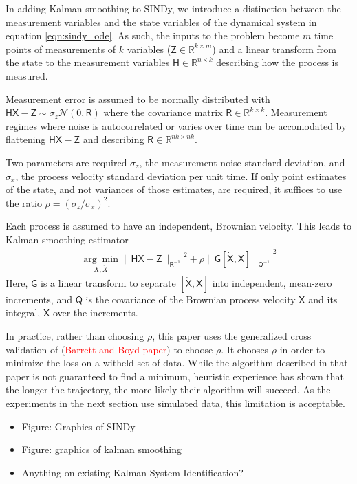 \documentclass{article}
\newcommand{\red}[1]{\textcolor{red}{#1}}
\newcommand{\mat}[1]{\boldsymbol{\mathsf{#1}}}
\newcommand{\R}[1]{\mathbb{R}^{#1}}
\begin{document}
In adding Kalman smoothing to SINDy, we introduce a distinction between the measurement variables and the state variables of the dynamical system in equation
\ref{eqn:sindy_ode}.  As such, the inputs to the problem become $m$ time points of measurements of $k$ variables ($\mat Z\in \R{k\times m}$) and a linear transform from the state to the measurement variables $\mat H \in \R{n \times k}$ describing how the process is measured.

Measurement error is assumed to be normally distributed with $\mat H \mat X - \mat Z \sim \sigma_z \mathcal N(0, \mat R)$ where the covariance matrix $\mat R\in\R{k \times k}$.  Measurement regimes where noise is autocorrelated or varies over time can be accomodated by flattening $\mat H \mat X - \mat Z$ and describing $\mat R\in\R{nk \times nk}$.

Two parameters are required $\sigma_z$, the measurement noise standard deviation, and $\sigma_x$, the process velocity standard deviation per unit time.  If only point estimates of the state, and not variances of those estimates, are required, it suffices to use the ratio $\rho = (\sigma_z / \sigma_x)^2$.

Each process is assumed to have an independent, Brownian velocity.  This leads to Kalman smoothing estimator
\begin{align}
    \underset{X, \dot X}{\arg\min}{\|\mat H \mat X - \mat Z\|_{\mat R^{-1}}}^2 + \rho {\|\mat G [\mat {\dot X}, \mat X]\|_{\mat Q^{-1}}}^2
\end{align}
Here, $\mat G$ is a linear transform to separate $[\mat{\dot X}, \mat X]$ into independent, mean-zero increments, and $\mat Q$ is the covariance of the Brownian process velocity $\mat{\dot X}$ and its integral, $\mat X$ over the increments.

In practice, rather than choosing $\rho$, this paper uses the generalized cross validation of (\red{Barrett and Boyd paper}) to choose $\rho$.  It chooses $\rho$ in order to minimize the loss on a witheld set of data.  While the algorithm described in that paper is not guaranteed to find a minimum, heuristic experience has shown that the longer the trajectory, the more likely their algorithm will succeed.  As the experiments in the next section use simulated data, this limitation is acceptable.

\begin{itemize}
    \item Figure: Graphics of SINDy
    \item Figure: graphics of kalman smoothing
    \item Anything on existing Kalman System Identification?
\end{itemize}
\end{document}
